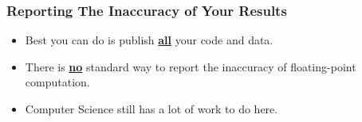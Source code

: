 \begin{frame}

\frametitle{Reporting The Inaccuracy of Your Results}

\begin{itemize}

\item Best you can do is publish \textbf{\underline{all}} your code and data.

\item There is \textbf{\underline{no}} standard way to report the inaccuracy of
floating-point computation.

\item Computer Science still has a lot of work to do here.

\end{itemize}

\end{frame}
